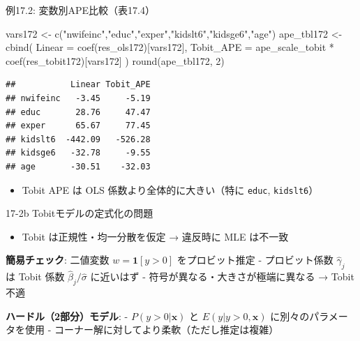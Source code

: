 \documentclass[
  ignorenonframetext,
]{beamer}
\newenvironment{Shaded}{\begin{snugshade}}{\end{snugshade}}
\newcommand{\AttributeTok}[1]{\textcolor[rgb]{0.77,0.63,0.00}{#1}}
\newcommand{\DecValTok}[1]{\textcolor[rgb]{0.00,0.00,0.81}{#1}}
\newcommand{\FunctionTok}[1]{\textcolor[rgb]{0.00,0.00,0.00}{#1}}
\newcommand{\NormalTok}[1]{#1}
\newcommand{\OtherTok}[1]{\textcolor[rgb]{0.56,0.35,0.01}{#1}}
\newcommand{\SpecialCharTok}[1]{\textcolor[rgb]{0.00,0.00,0.00}{#1}}
\newcommand{\StringTok}[1]{\textcolor[rgb]{0.31,0.60,0.02}{#1}}
\providecommand{\tightlist}{%
  \setlength{\itemsep}{0pt}\setlength{\parskip}{0pt}}
\begin{document}
\begin{frame}[fragile]{例17.2: 変数別APE比較（表17.4）}
\protect\hypertarget{ux4f8b17.2-ux5909ux6570ux5225apeux6bd4ux8f03ux886817.4}{}
\footnotesize

\begin{Shaded}
\begin{Highlighting}[]
\NormalTok{vars172 }\OtherTok{\textless{}{-}} \FunctionTok{c}\NormalTok{(}\StringTok{"nwifeinc"}\NormalTok{,}\StringTok{"educ"}\NormalTok{,}\StringTok{"exper"}\NormalTok{,}\StringTok{"kidslt6"}\NormalTok{,}\StringTok{"kidsge6"}\NormalTok{,}\StringTok{"age"}\NormalTok{)}
\NormalTok{ape\_tbl172 }\OtherTok{\textless{}{-}} \FunctionTok{cbind}\NormalTok{(}
  \AttributeTok{Linear    =} \FunctionTok{coef}\NormalTok{(res\_ols172)[vars172],}
  \AttributeTok{Tobit\_APE =}\NormalTok{ ape\_scale\_tobit }\SpecialCharTok{*} \FunctionTok{coef}\NormalTok{(res\_tobit172)[vars172]}
\NormalTok{)}
\FunctionTok{round}\NormalTok{(ape\_tbl172, }\DecValTok{2}\NormalTok{)}
\end{Highlighting}
\end{Shaded}

\begin{verbatim}
##           Linear Tobit_APE
## nwifeinc   -3.45     -5.19
## educ       28.76     47.47
## exper      65.67     77.45
## kidslt6  -442.09   -526.28
## kidsge6   -32.78     -9.55
## age       -30.51    -32.03
\end{verbatim}

\normalsize

\begin{itemize}
\tightlist
\item
  Tobit APE は OLS 係数より全体的に大きい（特に \texttt{educ},
  \texttt{kidslt6}）
\end{itemize}
\end{frame}

\begin{frame}{17-2b Tobitモデルの定式化の問題}
\protect\hypertarget{b-tobitux30e2ux30c7ux30ebux306eux5b9aux5f0fux5316ux306eux554fux984c}{}
\begin{itemize}
\tightlist
\item
  Tobit は正規性・均一分散を仮定 → 違反時に MLE は不一致
\end{itemize}

\textbf{簡易チェック}: 二値変数 \(w = \mathbf{1}[y > 0]\)
をプロビット推定 - プロビット係数 \(\hat{\gamma}_j\) は Tobit 係数
\(\hat{\beta}_j/\hat{\sigma}\) に近いはず -
符号が異なる・大きさが極端に異なる → Tobit 不適

\textbf{ハードル（2部分）モデル}: - \(P(y > 0|\mathbf{x})\) と
\(E(y|y>0, \mathbf{x})\) に別々のパラメータを使用 -
コーナー解に対してより柔軟（ただし推定は複雑）
\end{frame}
\end{document}
